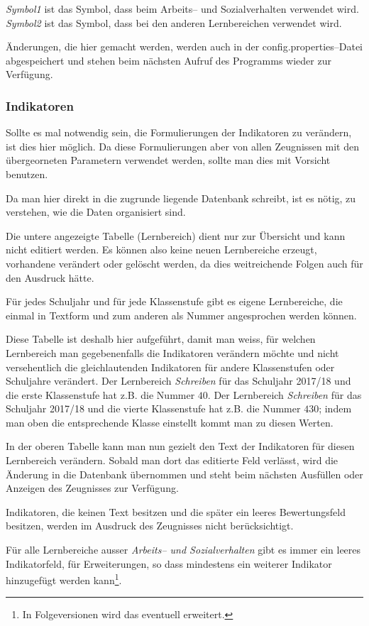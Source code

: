 \documentclass[a4paper,notitlepage,parskip]{scrartcl}
\newcommand\ott{\normalfont\ttfamily}
\begin{document}
\emph{Symbol1} ist das Symbol, dass beim Arbeits-- und Sozialverhalten verwendet wird. \emph{Symbol2} ist das Symbol, dass bei den anderen Lernbereichen verwendet wird.

Änderungen, die hier gemacht werden, werden auch in der {\ott config.properties}--Datei abgespeichert und stehen beim nächsten Aufruf des Programms wieder zur Verfügung.
\subsubsection{Indikatoren}
Sollte es mal notwendig sein, die Formulierungen der Indikatoren zu verändern, ist dies hier möglich.
Da diese Formulierungen aber von allen Zeugnissen mit den übergeorneten Parametern verwendet werden, sollte man dies mit Vorsicht benutzen.

Da man hier direkt in die zugrunde liegende Datenbank schreibt, ist es nötig, zu verstehen, wie die Daten organisiert sind.

Die untere angezeigte Tabelle (Lernbereich) dient nur zur Übersicht und kann nicht editiert werden.
Es können also keine neuen Lernbereiche erzeugt, vorhandene verändert oder gelöscht werden, da dies weitreichende Folgen auch für den Ausdruck hätte.

Für jedes Schuljahr und für jede Klassenstufe gibt es eigene Lernbereiche, die einmal in Textform und zum anderen als Nummer angesprochen werden können.

Diese Tabelle ist deshalb hier aufgeführt, damit man weiss, für welchen Lernbereich man gegebenenfalls die Indikatoren verändern möchte und nicht versehentlich die gleichlautenden Indikatoren für andere Klassenstufen oder Schuljahre verändert. Der Lernbereich \emph{Schreiben} für das Schuljahr 2017/18 und die erste Klassenstufe hat z.B. die Nummer $40$.
Der Lernbereich \emph{Schreiben} für das Schuljahr 2017/18 und die vierte Klassenstufe hat z.B. die Nummer $430$; indem man oben die entsprechende Klasse einstellt kommt man zu diesen Werten.

In der oberen Tabelle kann man nun gezielt den Text der Indikatoren für diesen Lernbereich verändern. Sobald man dort das editierte Feld verlässt, wird die Änderung in die Datenbank übernommen und steht beim nächsten Ausfüllen oder Anzeigen des Zeugnisses zur Verfügung.

Indikatoren, die keinen Text besitzen und die später ein leeres Bewertungsfeld besitzen, werden im Ausdruck des Zeugnisses nicht berücksichtigt.

Für alle Lernbereiche ausser \emph{Arbeits-- und Sozialverhalten} gibt es immer ein leeres Indikatorfeld, für Erweiterungen, so dass mindestens ein weiterer Indikator hinzugefügt werden kann\footnote{In Folgeversionen wird das eventuell erweitert.}.
\end{document}
